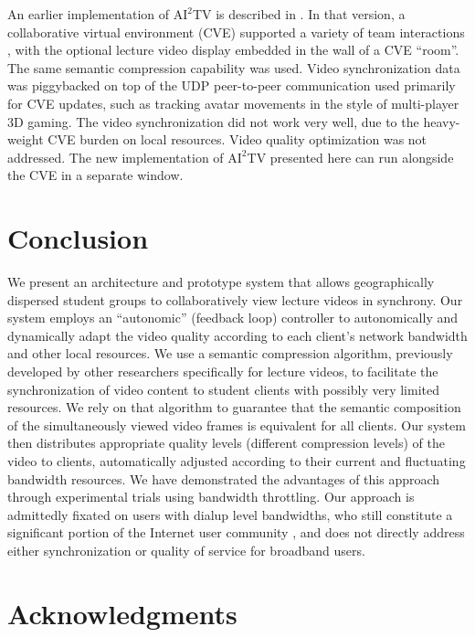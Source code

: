 \documentclass{sig-alternate}
\begin{document}
An earlier implementation of $\mathrm{AI}^2$TV is described in
\cite{VECTORS}.  In that version, a collaborative virtual environment
(CVE) supported a variety of team interactions \cite{CHIME}, with the
optional lecture video display embedded in the wall of a CVE ``room''.
The same semantic compression capability was used. Video
synchronization data was piggybacked on top of the UDP peer-to-peer
communication used primarily for CVE updates, such as tracking avatar
movements in the style of multi-player 3D gaming.  The video
synchronization did not work very well, due to the heavy-weight CVE
burden on local resources. Video quality optimization was not
addressed.  The new implementation of $\mathrm{AI}^2$TV presented here
can run alongside the CVE in a separate window.

\section{Conclusion}

We present an architecture and prototype system that allows
geographically dispersed student groups to collaboratively view
lecture videos in synchrony.  Our system employs an ``autonomic''
(feedback loop) controller to autonomically and dynamically adapt the
video quality according to each client's network bandwidth and other
local resources.  We use a semantic compression algorithm, previously
developed by other researchers specifically for lecture videos, to
facilitate the synchronization of video content to student clients
with possibly very limited resources.  We rely on that algorithm to
guarantee that the semantic composition of the simultaneously viewed
video frames is equivalent for all clients.  Our system then
distributes appropriate quality levels (different compression levels)
of the video to clients, automatically adjusted according to their
current and fluctuating bandwidth resources.  We have demonstrated the
advantages of this approach through experimental trials using
bandwidth throttling.  Our approach is admittedly fixated on users
with dialup level bandwidths, who still constitute a significant
portion of the Internet user community \cite{dialup}, and does not
directly address either synchronization or quality of service for
broadband users.

\section{Acknowledgments}
\end{document}
